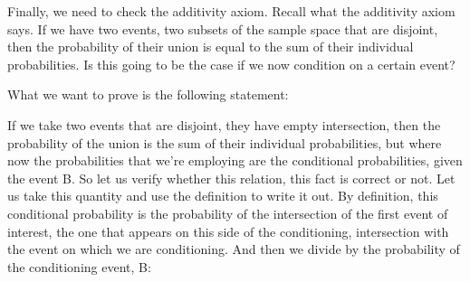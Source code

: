 \documentclass[pdftex, brazil, 12pt, twoside]{article}
\begin{document}
Finally, we need to check the additivity axiom.
Recall what the additivity axiom says.
If we have two events, two subsets of the sample space
that are disjoint, then the probability of their union is
equal to the sum of their individual probabilities.
Is this going to be the case if we now condition on a
certain event?

\begin{figure}[H]
  \begin{center}
  \end{center}
\end{figure}

What we want to prove is the following statement:

\begin{figure}[H]
  \begin{center}
  \end{center}
\end{figure}

If we take two events that are disjoint, they have empty
intersection, then the probability of the union is
the sum of their individual probabilities, but where now
the probabilities that we're employing are the conditional
probabilities, given the event B. So let us verify whether
this relation, this fact is correct or not.
Let us take this quantity and use the
definition to write it out.
By definition, this conditional probability is the
probability of the intersection of the first
event of interest, the one that appears on this side of
the conditioning, intersection with the event on which we are
conditioning.
And then we divide by the probability of the
conditioning event, B:

\begin{figure}[H]
  \begin{center}
  \end{center}
\end{figure}
\end{document}
